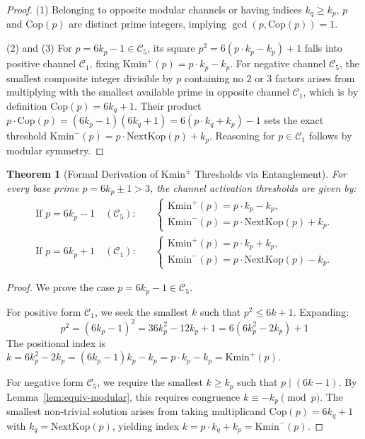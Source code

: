 \documentclass{article}
\numberwithin{equation}{section}
\theoremstyle{plain}
\newtheorem{theorem}{Theorem}[section]
\theoremstyle{definition}
\begin{document}
\begin{proof}
(1) Belonging to opposite modular channels or having indices $k_q \ge k_p$, $p$ and $\mathrm{Cop}(p)$ are distinct prime integers, implying $\gcd(p, \mathrm{Cop}(p)) = 1$.

(2) and (3) For $p = 6k_p - 1 \in \mathcal{C}_5$, its square $p^2 = 6(p \cdot k_p - k_p) + 1$ falls into positive channel $\mathcal{C}_1$, fixing $\mathrm{Kmin}^+(p) = p \cdot k_p - k_p$. For negative channel $\mathcal{C}_5$, the smallest composite integer divisible by $p$ containing no $2$ or $3$ factors arises from multiplying with the smallest available prime in opposite channel $\mathcal{C}_1$, which is by definition $\mathrm{Cop}(p) = 6 k_q + 1$. Their product $p \cdot \mathrm{Cop}(p) = (6k_p - 1)(6k_q + 1) = 6(p \cdot k_q + k_p) - 1$ sets the exact threshold $\mathrm{Kmin}^-(p) = p \cdot \mathrm{NextKop}(p) + k_p$. Reasoning for $p \in \mathcal{C}_1$ follows by modular symmetry.
\end{proof}

\begin{theorem}[Formal Derivation of $\mathrm{Kmin}^\pm$ Thresholds via Entanglement]
\label{thm:calculo-kmin-pm-completo}
For every base prime $p = 6k_p \pm 1 > 3$, the channel activation thresholds are given by:
\begin{align}
\text{If } p = 6k_p - 1 \quad (\mathcal{C}_5): &\quad 
\begin{cases}
\mathrm{Kmin}^+(p) = p \cdot k_p - k_p, \\
\mathrm{Kmin}^-(p) = p \cdot \mathrm{NextKop}(p) + k_p.
\end{cases} \\
\text{If } p = 6k_p + 1 \quad (\mathcal{C}_1): &\quad 
\begin{cases}
\mathrm{Kmin}^+(p) = p \cdot k_p + k_p, \\
\mathrm{Kmin}^-(p) = p \cdot \mathrm{NextKop}(p) - k_p.
\end{cases}
\end{align}
\end{theorem}

\begin{proof}
We prove the case $p = 6k_p - 1 \in \mathcal{C}_5$. 

For positive form $\mathcal{C}_1$, we seek the smallest $k$ such that $p^2 \le 6k + 1$. Expanding:
\begin{equation}
p^2 = (6k_p - 1)^2 = 36k_p^2 - 12k_p + 1 = 6(6k_p^2 - 2k_p) + 1
\end{equation}
The positional index is $k = 6k_p^2 - 2k_p = (6k_p - 1)k_p - k_p = p \cdot k_p - k_p = \mathrm{Kmin}^+(p)$.

For negative form $\mathcal{C}_5$, we require the smallest $k \ge k_p$ such that $p \mid (6k - 1)$. By Lemma~\ref{lem:equiv-modular}, this requires congruence $k \equiv -k_p \pmod p$. The smallest non-trivial solution arises from taking multiplicand $\mathrm{Cop}(p) = 6 k_q + 1$ with $k_q = \mathrm{NextKop}(p)$, yielding index $k = p \cdot k_q + k_p = \mathrm{Kmin}^-(p)$.
\end{proof}
\end{document}

